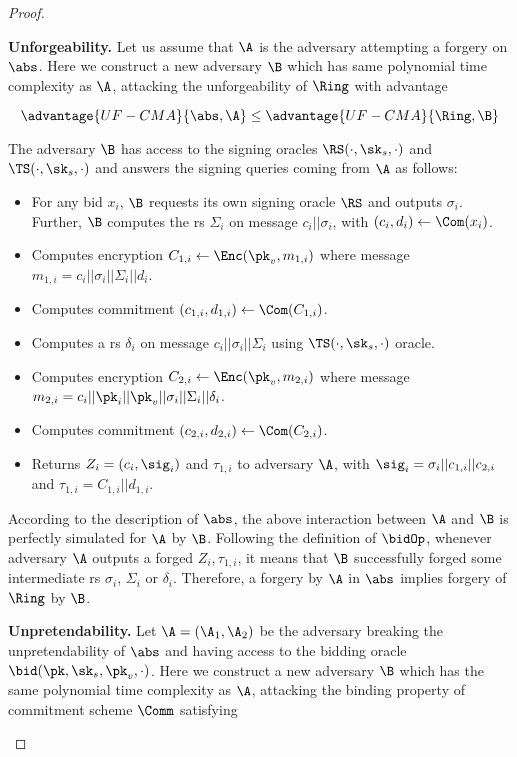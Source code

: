 \begin{proof}
\begin{description}
  \item \textbf{Unforgeability.} Let us assume that $\A$ is the
    adversary attempting a forgery on $\abs$. Here we construct a new adversary $\B$ which has same polynomial time complexity as $\A$, attacking the unforgeability of $\Ring$ with advantage
    
    \begin{equation*}
        \advantage{UF-CMA}{\abs, \A} \leq \advantage{UF-CMA}{\Ring, \B}
    \end{equation*}
    
    The adversary $\B$ has access to the signing oracles $\RS(\cdot,\sk_s,\cdot)$ and $\TS(\cdot,\sk_s,\cdot)$ and answers the signing queries coming from $\A$ as follows:
    \begin{itemize}
    \item For any bid $x_i$, $\B$ requests its own signing oracle $\RS$ and outputs $\sigma_i$. Further, $\B$ computes the \gls{rs} $\Sigma_i$ on message $c_i||\sigma_i$, with $(c_i, d_i) \gets \Com(x_i)$.
    \item Computes encryption $C_{1,i}\gets\Enc(\pk_v, m_{1,i})$ where message $m_{1,i} = c_i || \sigma_i || \Sigma_i || d_i$.
    \item Computes commitment $(c_{1,i}, d_{1,i}) \gets \Com(C_{1,i})$.
    \item Computes a \gls{rs} $\delta_i$ on message $c_i || \sigma_i || \Sigma_i$ using $\TS(\cdot,\sk_s,\cdot)$ oracle.
    \item Computes encryption $C_{2,i} \gets \Enc(\pk_v, m_{2,i})$ where message $m_{2,i} = c_i || \pk_i || \pk_v || \sigma_i || \Sigma_i || \delta_i$.
    \item Computes commitment $(c_{2,i}, d_{2,i}) \gets \Com(C_{2,i})$.
    \item Returns $Z_i=(c_i, \sig_i)$ and $\tau_{1,i}$ to adversary $\A$, with $\sig_i = \sigma_i || c_{1,i} || c_{2,i}$ and $\tau_{1,i} = C_{1,i} || d_{1,i}$.
    \end{itemize}
    
    According to the description of $\abs$, the above interaction between $\A$ and $\B$ is perfectly simulated for $\A$ by $\B$. Following the definition of $\bidOp$, whenever adversary $\A$ outputs a forged $Z_i, \tau_{1,i}$, it means that $\B$ successfully forged some intermediate \gls{rs} $\sigma_i$, $\Sigma_i$ or $\delta_i$. Therefore, a forgery by $\A$ in $\abs$ implies forgery of $\Ring$ by $\B$.

  \item \textbf{Unpretendability.} Let $\A=(\A_1,\A_2)$ be the
    adversary breaking the unpretendability of $\abs$ and having access to the bidding oracle $\bid(\pk, \sk_s, \pk_v, \cdot)$. Here we construct a new adversary $\B$ which has the same polynomial time complexity as $\A$, attacking the binding property of commitment scheme $\Comm$ satisfying


\end{description}
\end{proof}
